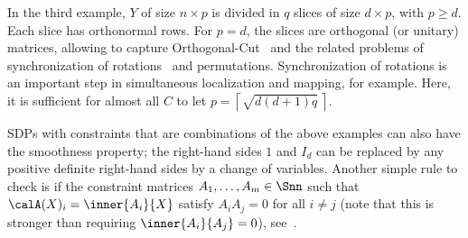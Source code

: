 \documentclass{article}
\newcommand{\1}{\mathbf{1}}
\begin{document}
In the third example, $Y$ of size $n\times p$ is divided in $q$ slices of size $d\times p$, with $p \geq d$. Each slice has orthonormal rows. For $p=d$, the slices are orthogonal (or unitary) matrices, allowing to capture Orthogonal-Cut~\citep{bandeira2013approximating} and the related problems of synchronization of rotations~\citep{wang2012LUD} and permutations. Synchronization of rotations is an important step in simultaneous localization and mapping, for example.
Here, it is sufficient for almost all $C$ to let $p = \left\lceil \sqrt{d(d+1)q} \, \right\rceil$.

SDPs with constraints that are combinations of the above examples can also have the smoothness property;
the right-hand sides $1$ and $I_d$ can be replaced by any positive definite right-hand sides by a change of variables. Another simple rule to check is if the constraint matrices $A_1, \ldots, A_m \in \Snn$ such that $\calA(X)_i = \inner{A_i}{X}$ satisfy $A_iA_j = 0$ for all $i \neq j$ (note that this is stronger than requiring $\inner{A_i}{A_j} = 0$), see~\citep{journee2010low}.
\end{document}

